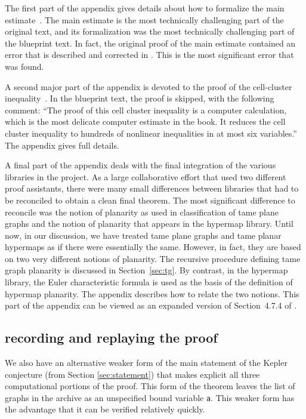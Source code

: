 The first part of the appendix gives details about how to formalize
the main estimate~\cite[Sec~7.4]{DSP}.  The main estimate is the most
technically challenging part of the original text, and its
formalization was the most technically challenging part of the
blueprint text.  In fact, the original proof of the main estimate
contained an error that is described and corrected in
\cite{HalesHMNOZ10}.  This is the most significant error that was
found.

A second major part of the appendix is devoted to the proof of the
cell-cluster inequality~\cite[Thm~6.93]{DSP}.  In the blueprint text,
the proof is skipped, with the following comment: ``The proof of this
cell cluster inequality is a computer calculation, which is the most
delicate computer estimate in the book.  It reduces the cell cluster
inequality to hundreds of nonlinear inequalities in at most six
variables.''  The appendix gives full details.

A final part of the appendix deals with the final integration of the
various libraries in the project.  As a large collaborative effort
that used two different proof assistants, there were many small
differences between libraries that had to be reconciled to obtain a
clean final theorem.  The most significant difference to reconcile was
the notion of planarity as used in classification of tame plane graphs
and the notion of planarity that appears in the hypermap library.
Until now, in our discussion, we have treated tame plane graphs and
tame planar hypermaps as if there were essentially the same.  However, in
fact, they are based on two very different notions of planarity.  The
recursive procedure defining tame graph planarity is discussed in
Section~\ref{sec:tg}.  By contrast, in the hypermap library, the Euler
characteristic formula is used as the basis of the definition of
hypermap planarity.  The appendix describes how to relate the two
notions.  This part of the appendix can be viewed as an expanded
version of Section~4.7.4 of \cite{DSP}.


\subsection{recording and replaying the proof}\label{sec:rec}

We also have an alternative weaker form of the main statement of the
Kepler conjecture (from Section \ref{sec:statement}) that makes
explicit all three computational portions of the proof.  This form of
the theorem leaves the list of graphs in the archive as an unspecified
bound variable \verb!a!.  This weaker form has the advantage that it
can be verified relatively quickly.

